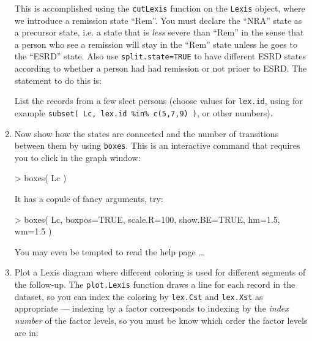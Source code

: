 \begin{enumerate}
  This is accomplished using the \texttt{cutLexis} function on the
  \texttt{Lexis} object, where we introduce a remission state ``Rem''.
  You must declare the ``NRA'' state as a precursor state, i.e. a
  state that is \emph{less} severe than ``Rem'' in the sense that a
  person who see a remission will stay in the ``Rem'' state unless he
  goes to the ``ESRD'' state. Also use \texttt{split.state=TRUE} to
  have different ESRD states according to whether a person had had
  remission or not prioer to ESRD. The statement to do this is:
\begin{Schunk}
\end{Schunk}
List the records from a few slect persons (choose values for
\texttt{lex.id}, using for example \texttt{subset( Lc, lex.id \%in\%
c(5,7,9) )}, or other numbers).
\item Now show how the states are connected and the number of transitions
  between them by using \texttt{boxes}. This is an interactive command
  that requires you to click in the graph window:
\begin{Schunk}
\begin{Sinput}
> boxes( Lc )
\end{Sinput}
\end{Schunk}
It has a copule of fancy arguments, try:
\begin{Schunk}
\begin{Sinput}
> boxes( Lc, boxpos=TRUE, scale.R=100, show.BE=TRUE, hm=1.5, wm=1.5 )
\end{Sinput}
\end{Schunk}
You may even be tempted to read the help page \ldots
\item Plot a Lexis diagram where different coloring is
  used for different segments of the follow-up. The
  \texttt{plot.Lexis} function draws a line for each record in the
  dataset, so you can index the coloring by \texttt{lex.Cst} and
  \texttt{lex.Xst} as appropriate --- indexing by a factor corresponds
  to indexing by the \emph{index number} of the factor levels, so you
  must be know which order the factor levels are in:
\begin{Schunk}

\end{Schunk}
\end{enumerate}

